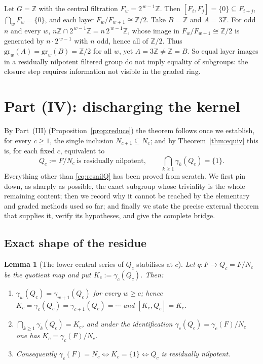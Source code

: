\documentclass{amsart}
\newtheorem{lemma}{Lemma}
\theoremstyle{definition}
\theoremstyle{remark}
\begin{document}
\begin{example}\label{ex:Z}
Let $G=\mathbb Z$ with the central filtration $F_w=2^{\,w-1}\mathbb Z$. Then
$[F_i,F_j]=\{0\}\subseteq F_{i+j}$, $\bigcap_w F_w=\{0\}$, and each layer
$F_w/F_{w+1}\cong\mathbb Z/2$. Take $B=\mathbb Z$ and $A=3\mathbb Z$. For odd $n$
and every $w$, $n\mathbb Z\cap2^{\,w-1}\mathbb Z=n\,2^{\,w-1}\mathbb Z$, whose
image in $F_w/F_{w+1}\cong\mathbb Z/2$ is generated by $n\cdot2^{\,w-1}$ with $n$
odd, hence all of $\mathbb Z/2$. Thus $\mathrm{gr}_w(A)=\mathrm{gr}_w(B)=\mathbb
Z/2$ for all $w$, yet $A=3\mathbb Z\ne\mathbb Z=B$. So equal layer images in a
residually nilpotent filtered group do not imply equality of subgroups: the closure
step requires information not visible in the graded ring.
\end{example}

\section{Part (IV): discharging the kernel}\label{sec:final}

By Part~(III) (Proposition~\ref{prop:reduce}) the theorem follows once we
establish, for every $c\ge1$, the single inclusion $N_{c+1}\subseteq N_c$; and by
Theorem~\ref{thm:equiv} this is, for each fixed $c$, equivalent to
\begin{equation}\label{eq:resnilQ}
Q_c:=F/N_c\ \text{is residually nilpotent},\qquad
\textstyle\bigcap_{k\ge1}\gamma_k(Q_c)=\{1\}.
\end{equation}
Everything other than \eqref{eq:resnilQ} has been proved from scratch. We first
pin down, as sharply as possible, the exact subgroup whose triviality is the whole
remaining content; then we record why it cannot be reached by the elementary and
graded methods used so far; and finally we state the precise external theorem that
supplies it, verify its hypotheses, and give the complete bridge.

\subsection{Exact shape of the residue}

\begin{lemma}[The lower central series of $Q_c$ stabilises at $c$]\label{lem:stabilise}
Let $q\colon F\to Q_c=F/N_c$ be the quotient map and put $K_c:=\gamma_c(Q_c)$. Then:
\begin{enumerate}
\item[(i)] $\gamma_w(Q_c)=\gamma_{w+1}(Q_c)$ for every $w\ge c$; hence
$K_c=\gamma_c(Q_c)=\gamma_{c+1}(Q_c)=\cdots$ and $[K_c,Q_c]=K_c$.
\item[(ii)] $\displaystyle\bigcap_{k\ge1}\gamma_k(Q_c)=K_c$, and under the
identification $\gamma_c(Q_c)=\gamma_c(F)/N_c$ one has $K_c=\gamma_c(F)/N_c$.
\item[(iii)] Consequently $\gamma_c(F)=N_c\iff K_c=\{1\}\iff Q_c$ is residually
nilpotent.
\end{enumerate}
\end{lemma}
\end{document}
